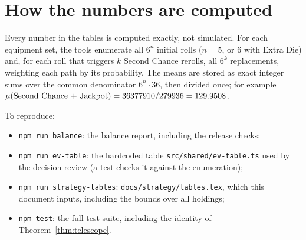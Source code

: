 \documentclass[11pt]{article}
\theoremstyle{definition}
\begin{document}
\appendix
\section{How the numbers are computed}
Every number in the tables is computed exactly, not simulated. For each equipment set, the tools enumerate all $6^n$ initial rolls ($n = 5$, or $6$ with Extra Die) and, for each roll that triggers $k$ Second Chance rerolls, all $6^k$ replacements, weighting each path by its probability. The means are stored as exact integer sums over the common denominator $6^n \cdot 36$, then divided once; for example $\mu(\text{Second Chance + Jackpot}) = 36377910/279936 = 129.9508$.

To reproduce:
\begin{itemize}
\item \texttt{npm run balance}: the balance report, including the release checks;
\item \texttt{npm run ev-table}: the hardcoded table \texttt{src/shared/ev-table.ts} used by the decision review (a test checks it against the enumeration);
\item \texttt{npm run strategy-tables}: \texttt{docs/strategy/tables.tex}, which this document inputs, including the bounds over all holdings;
\item \texttt{npm test}: the full test suite, including the identity of Theorem~\ref{thm:telescope}.
\end{itemize}
\end{document}
